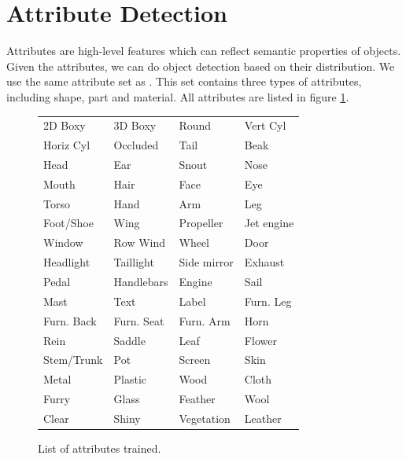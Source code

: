 \documentclass[10pt,twocolumn,letterpaper]{article}
\begin{document}


\section{Attribute Detection}
\label{sec:attribute}

Attributes are high-level features which can reflect semantic properties of objects. Given the attributes, we can do object detection based on their distribution. We use the same attribute set as \cite{farhadi09}. This set contains three types of attributes, including shape, part and material. All attributes are listed in figure \ref{fig:atts}.

\begin{figure}
\begin{tabular}{llll}
2D Boxy & 3D Boxy & Round & Vert Cyl \\
Horiz Cyl & Occluded & Tail & Beak \\
Head & Ear & Snout & Nose \\
Mouth & Hair & Face & Eye \\
Torso & Hand & Arm & Leg \\
Foot/Shoe & Wing & Propeller & Jet engine \\
Window & Row Wind & Wheel & Door \\
Headlight & Taillight & Side mirror & Exhaust \\
Pedal & Handlebars & Engine & Sail \\
Mast & Text & Label & Furn. Leg \\
Furn. Back & Furn. Seat & Furn. Arm & Horn \\
Rein & Saddle & Leaf & Flower \\
Stem/Trunk & Pot & Screen & Skin \\
Metal & Plastic & Wood & Cloth \\
Furry & Glass & Feather & Wool \\
Clear & Shiny & Vegetation & Leather \\
\end{tabular}
\caption{List of attributes trained.}
\label{fig:atts}
\end{figure}
\end{document}

